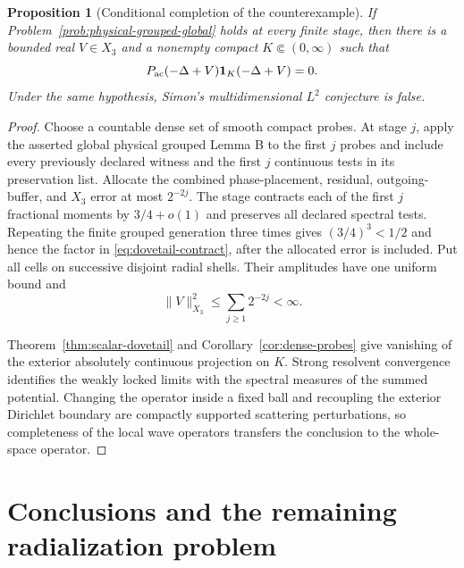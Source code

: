 \documentclass[11pt]{article}
\newtheorem{proposition}[theorem]{Proposition}
\theoremstyle{remark}
\begin{document}
\begin{proposition}[Conditional completion of the counterexample]
\label{prop:conditional-counterexample-final}
If Problem~\ref{prob:physical-grouped-global} holds at every finite stage,
then there is a bounded real $V\in X_3$ and a nonempty compact
$K\Subset(0,\infty)$ such that
\begin{equation}
 P_{\rm ac}(-\Delta+V)\mathbf1_K(-\Delta+V)=0.
 \label{eq:final-counterexample}
\end{equation}
Under the same hypothesis, Simon's multidimensional $L^2$ conjecture is false.
\end{proposition}

\begin{proof}
Choose a countable dense set of smooth compact probes.  At stage $j$, apply
the asserted global physical grouped Lemma B to the first $j$ probes and
include every previously declared witness and the first $j$ continuous tests
in its preservation list.  Allocate the combined phase-placement, residual,
outgoing-buffer, and $X_3$ error at most $2^{-2j}$.  The stage contracts each
of the first $j$ fractional moments by $3/4+o(1)$ and preserves all declared
spectral tests.  Repeating the finite grouped generation three
times gives $(3/4)^3<1/2$ and hence the factor in
\eqref{eq:dovetail-contract}, after the allocated error is included.  Put all
cells on successive disjoint radial shells.  Their amplitudes have one
uniform bound and
\begin{equation}
 \|V\|_{X_3}^2\leq\sum_{j\geq1}2^{-2j}<\infty.
 \label{eq:counterexample-X3-cost}
\end{equation}

Theorem~\ref{thm:scalar-dovetail} and Corollary~\ref{cor:dense-probes} give
vanishing of the exterior absolutely continuous projection on $K$.  Strong
resolvent convergence identifies the weakly locked limits with the spectral
measures of the summed potential.  Changing the operator inside a fixed ball
and recoupling the exterior Dirichlet boundary are compactly supported
scattering perturbations, so completeness of the local wave operators
transfers the conclusion to the whole-space operator.
\end{proof}

\section{Conclusions and the remaining radialization problem}
\end{document}
